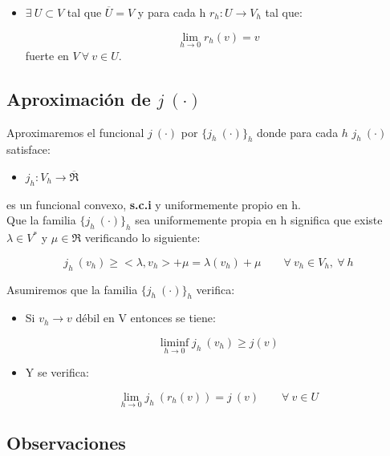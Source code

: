 \begin{itemize}
\item $\exists \ U\subset V$ tal que $\overline{U}=V$ y para cada h
$r_h:U\longrightarrow V_h$ tal que:

\begin{displaymath}
\lim_{h\to 0} r_h(v) = v
\end{displaymath}
fuerte en $V\ \forall \ v \in U$.
\end{itemize}

\subsection{Aproximaci\'on de $j\ (\cdot )$}

Aproximaremos el funcional $j\ (\cdot )$ por $\{j_h\ (\cdot ) \}_h$ donde para
cada $h$ $j_h\ (\cdot )$ satisface:

\begin{itemize}
\item $j_h:V_h \longrightarrow \overline{\Re}$
\end{itemize}
es un funcional convexo, \textbf{s.c.i} y uniformemente propio en h.\\

Que la familia $\{j_h\ (\cdot )\}_h$ sea uniformemente propia en h significa
que existe $\lambda \in V^*$ y $\mu \in \Re$ verificando lo siguiente:

\begin{displaymath}
j_h\ (v_h) \ge <\lambda,v_h>+\mu= \lambda (v_h)+\mu \qquad \forall \ v_h \in
V_h,\ \forall \ h
\end{displaymath}

Asumiremos que la familia $\{j_h\ (\cdot ) \}_h$ verifica:

\begin{itemize}
\item Si $v_h \to v$ d\'ebil en V entonces se tiene:

\begin{displaymath}
\liminf_{h\to 0} j_h\ (v_h) \ge j(v)
\end{displaymath}

\item Y se verifica:

\begin{displaymath}
\lim_{h\to 0} j_h\ (r_h(v)) = j\ (v)\qquad \forall \ v \in U
\end{displaymath}
\end{itemize}

\subsection{Observaciones}

